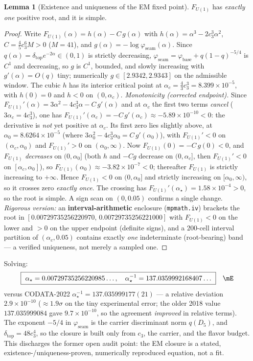 \documentclass[11pt,a4paper]{article}
\newcommand{\cthree}{c_3}
\newcommand{\phibase}{\varphi_{\mathrm{base}}}
\newcommand{\phiseam}{\varphi_{\mathrm{seam}}}
\newcommand{\dtop}{\delta_{\mathrm{top}}}
\newcommand{\ainv}{\alpha^{-1}_\star}
\theoremstyle{definition}
\newtheorem{lemma}{Lemma}
\begin{document}
\begin{lemma}[Existence and uniqueness of the EM fixed point]
\label{lem:emclosure}
$F_{U(1)}$ has \emph{exactly one} positive root, and it is simple.
\end{lemma}
\begin{proof}
Write $F_{U(1)}(\alpha)=h(\alpha)-C\,g(\alpha)$ with $h(\alpha)=\alpha^3-2\cthree^3\alpha^2$,
$C=\tfrac45\cthree^6M>0$ ($M=41$), and $g(\alpha)=-\log\phiseam(\alpha)$. Since
$q(\alpha)=\dtop e^{-2\alpha}\in(0,1)$ is strictly decreasing, $\phiseam=\phibase+q(1-q)^{-5/4}$ is $C^1$
and decreasing, so $g$ is $C^1$, bounded, and slowly increasing with $g'(\alpha)=O(q)$ tiny; numerically
$g\in[2.9342,2.9343]$ on the admissible window. The cubic $h$ has its interior critical point at
$\alpha_c=\tfrac43\cthree^3=8.399\times10^{-5}$, with $h(0)=0$ and $h<0$ on $(0,\alpha_c)$.
\emph{Monotonicity (corrected endpoint).} Since
$F_{U(1)}'(\alpha)=3\alpha^2-4\cthree^3\alpha-C\,g'(\alpha)$ and at $\alpha_c$ the first two terms
\emph{cancel} ($3\alpha_c=4\cthree^3$), one has $F_{U(1)}'(\alpha_c)=-C\,g'(\alpha_c)\approx-5.89\times10^{-10}<0$:
the derivative is \emph{not} yet positive at $\alpha_c$. Its first zero lies slightly above, at
$\alpha_0=8.6264\times10^{-5}$ (where $3\alpha_0^2-4\cthree^3\alpha_0=C\,g'(\alpha_0)$), with $F_{U(1)}'<0$ on
$(\alpha_c,\alpha_0)$ and $F_{U(1)}'>0$ on $(\alpha_0,\infty)$. Now $F_{U(1)}(0)=-C\,g(0)<0$, and
$F_{U(1)}$ \emph{decreases} on $(0,\alpha_0]$ (both $h$ and $-Cg$ decrease on $(0,\alpha_c]$, then $F_{U(1)}'<0$
on $[\alpha_c,\alpha_0]$), so $F_{U(1)}(\alpha_0)\approx-3.82\times10^{-7}<0$; thereafter $F_{U(1)}$ is strictly
increasing to $+\infty$. Hence $F_{U(1)}<0$ on $(0,\alpha_0]$ and strictly increasing on $[\alpha_0,\infty)$, so
it crosses zero \emph{exactly once}. The crossing has $F_{U(1)}'(\alpha_\star)=1.58\times10^{-4}>0$, so the
root is simple. A sign scan on $(0,0.05)$ confirms a single change. \emph{Rigorous version:} an
\textbf{interval-arithmetic} enclosure (\texttt{mpmath.iv}) brackets the root in
$[0.00729735256220970,\,0.00729735256221000]$ with $F_{U(1)}<0$ on the lower and $>0$ on the upper
endpoint (definite signs), and a $200$-cell interval partition of $(\alpha_c,0.05)$ contains exactly
\emph{one} indeterminate (root-bearing) band --- a verified uniqueness, not merely a sampled one.
\end{proof}

\noindent Solving:
\begin{equation}
  \boxed{\ \alpha_\star=0.00729735256220985\ldots,\quad \ainv=137.0359992168407\ldots\ }\quad\mE
\end{equation}
\;
versus CODATA-2022 $\ainv=137.035999177(21)$ --- a relative deviation $2.9\times10^{-10}$ ($\approx1.9\sigma$
on the tiny experimental error; the older 2018 value $137.035999084$ gave $9.7\times10^{-10}$, so the
agreement \emph{improved} in relative terms). The exponent $-5/4$ in $\phiseam$ is the carrier
discriminant norm $q(D_5)$, and $\dtop=48\cthree^4$, so the closure is built only from $\cthree$, the
carrier, and the flavor budget. This discharges the former open audit point: the EM closure is a stated,
existence-/uniqueness-proven, numerically reproduced equation, not a fit.
\end{document}

